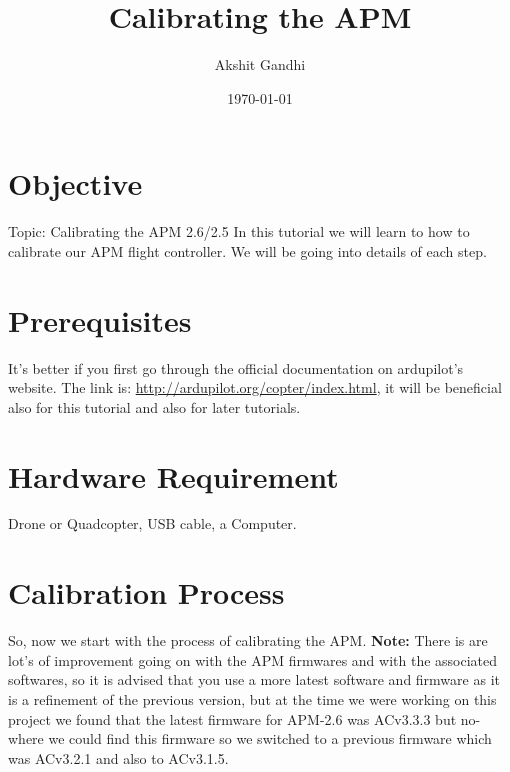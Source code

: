 \documentclass[11pt,a4paper]{article}
\title{Calibrating the APM}
\author{Akshit Gandhi}
\date{\today}
\begin{document}
	\maketitle
	\newpage
	\tableofcontents
	\newpage
	\section{Objective}
	Topic: Calibrating the APM 2.6/2.5
		In this tutorial we will learn to how to calibrate our APM flight controller. We will be going into details of each step.
	\section{Prerequisites}
	 It's better if you first go through the official documentation on ardupilot's website. The link is: \url{http://ardupilot.org/copter/index.html}, it will be beneficial also for this tutorial and also for later tutorials.
	\section{Hardware Requirement}
	 Drone or Quadcopter, USB cable, a Computer.
	\section{Calibration Process}
	 So, now we start with the process of calibrating the APM. \textbf{Note:} There is are lot's of improvement going on with the APM firmwares and with the associated softwares, so it is advised that you use a more latest software and firmware as it is a refinement of the previous version, but at the time we were working on this project we found that the latest firmware for APM-2.6 was ACv3.3.3 but no-where we could find this firmware so we switched to a previous firmware which was ACv3.2.1 and also to ACv3.1.5.
\end{document}
